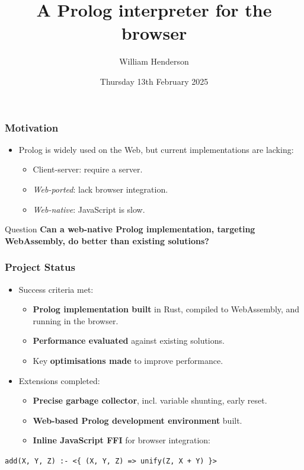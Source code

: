 \documentclass{beamer}
\title{A Prolog interpreter for the browser}
\author{William Henderson}
\institute{Churchill College \\
University of Cambridge}
\date{Thursday 13th February 2025}
\begin{document}
\frame{\titlepage}

\begin{frame}
\frametitle{Motivation}

\begin{itemize}
\item Prolog is widely used on the Web, but current implementations are lacking:
\begin{itemize}
\item Client-server: require a server.
\item \emph{Web-ported}: lack browser integration.
\item \emph{Web-native}: JavaScript is slow.
\end{itemize}
\end{itemize}

\vspace*{5mm}

\begin{block}{Question}
\textbf{Can a web-native Prolog implementation, targeting WebAssembly, do better than existing solutions?}
\end{block}

\end{frame}

\begin{frame}
\frametitle{Project Status}

\begin{itemize}
\item Success criteria met:
\begin{itemize} 
\item[\checkmark] \textbf{Prolog implementation built} in Rust, compiled to WebAssembly, and running in the browser.
\item[\checkmark] \textbf{Performance evaluated} against existing solutions.
\item[\checkmark] Key \textbf{optimisations made} to improve performance.
\end{itemize}

\item Extensions completed:
\begin{itemize}
\item[\checkmark] \textbf{Precise garbage collector}, incl. variable shunting, early reset.
\item[\checkmark] \textbf{Web-based Prolog development environment} built.
\item[\checkmark] \textbf{Inline JavaScript FFI} for browser integration:
\end{itemize}
\end{itemize}

\vspace*{2mm}

\begin{center}
\texttt{add(X, Y, Z) :- <\{ (X, Y, Z) => unify(Z, X + Y) \}>}
\end{center}

\end{frame}
\end{document}
